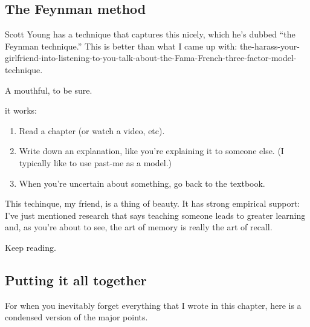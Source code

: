 \subsection{The Feynman method}\label{the-feynman-method}

Scott Young has a technique that captures this nicely, which he's dubbed
``the Feynman technique.'' This is better than what I came up with:
the-harass-your-girlfriend-into-listening-to-you-talk-about-the-Fama-French-three-factor-model-technique.

A mouthful, to be sure.

 it works:

\begin{enumerate}
\def\labelenumi{\arabic{enumi}.}
\itemsep1pt\parskip0pt
\item
  Read a chapter (or watch a video, etc).
\item
  Write down an explanation, like you're explaining it to someone else.
  (I typically like to use past-me as a model.)
\item
  When you're uncertain about something, go back to the textbook.
\end{enumerate}

This techinque, my friend, is a thing of beauty. It has strong empirical
support: I've just mentioned research that says teaching someone leads
to greater learning and, as you're about to see, the art of memory is
really the art of recall.

Keep reading.

\subsection{Putting it all together}\label{putting-it-all-together}

For when you inevitably forget everything that I wrote in this chapter,
here is a condensed version of the major points.

